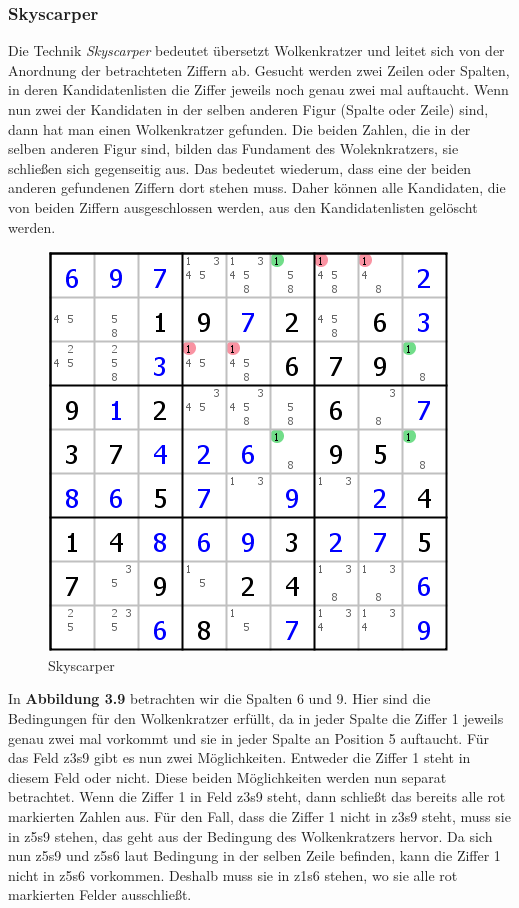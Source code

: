 \subsubsection{Skyscarper}
\label{Skyscarper}
Die Technik \textit{Skyscarper} bedeutet übersetzt Wolkenkratzer und leitet sich von der Anordnung der betrachteten Ziffern ab. Gesucht werden zwei Zeilen oder Spalten, in deren Kandidatenlisten die Ziffer jeweils noch genau zwei mal auftaucht. Wenn nun zwei der Kandidaten in der selben anderen Figur (Spalte oder Zeile) sind, dann hat man einen Wolkenkratzer gefunden. Die beiden Zahlen, die in der selben anderen Figur sind, bilden das Fundament des Woleknkratzers, sie schließen sich gegenseitig aus. Das bedeutet wiederum, dass eine der beiden anderen gefundenen Ziffern dort stehen muss. Daher können alle Kandidaten, die von beiden Ziffern ausgeschlossen werden, aus den Kandidatenlisten gelöscht werden.	

\begin{figure}[h]
\begin{center}
\includegraphics{./img/skyscarper.png}
\caption{Skyscarper}
\end{center}
\end{figure}

In \textbf{Abbildung 3.9} betrachten wir die Spalten 6 und 9. Hier sind die Bedingungen für den Wolkenkratzer erfüllt, da in jeder Spalte die Ziffer 1 jeweils genau zwei mal vorkommt und sie in jeder Spalte an Position 5 auftaucht. Für das Feld z3s9 gibt es nun zwei Möglichkeiten. Entweder die Ziffer 1 steht in diesem Feld oder nicht. Diese beiden Möglichkeiten werden nun separat betrachtet. Wenn die Ziffer 1 in Feld z3s9 steht, dann schließt das bereits alle rot markierten Zahlen aus. Für den Fall, dass die Ziffer 1 nicht in z3s9 steht, muss sie in z5s9 stehen, das geht aus der Bedingung des Wolkenkratzers hervor. Da sich nun z5s9 und z5s6 laut Bedingung in der selben Zeile befinden, kann die Ziffer 1 nicht in z5s6 vorkommen. Deshalb muss sie in z1s6 stehen, wo sie alle rot markierten Felder ausschließt.